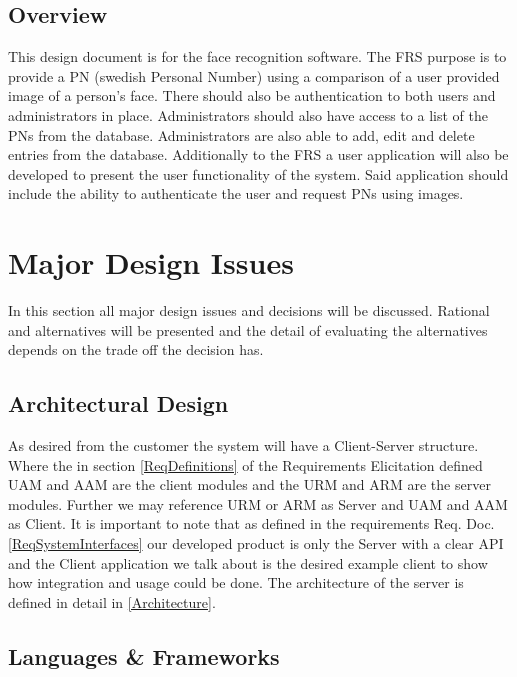 \documentclass[a4paper,11pt]{article}
\begin{document}
\subsection{Overview}
This design document is for the face recognition software. The FRS purpose is to provide a PN (swedish Personal Number) using a comparison of a user provided image of a person's face. There should also be authentication to both users and administrators in place. Administrators should also have access to a list of the PNs from the database. Administrators are also able to add, edit and delete entries from the database.
Additionally to the FRS a user application will also be developed to present the user functionality of the system. Said application should include the ability to authenticate the user and request PNs using images.

\section{Major Design Issues} \label{Major_Design_Issues}
In this section all major design issues and decisions will be discussed. Rational and alternatives will be presented and the detail of evaluating the alternatives depends on the trade off the decision has.

\subsection{Architectural Design} 
As desired from the customer the system will have a Client-Server structure. Where the in section \ref{ReqDefinitions} of the Requirements Elicitation defined UAM and AAM are the client modules and the URM and ARM are the server modules. Further we may reference URM or ARM as Server and UAM and AAM as Client. It is important to note that as defined in the requirements Req. Doc. \ref{ReqSystemInterfaces} our developed product is only the Server with a clear API and the Client application we talk about is the desired example client to show how integration and usage could be done.
The architecture of the server is defined in detail in \ref{Architecture}.

\subsection{Languages \& Frameworks}
\end{document}
